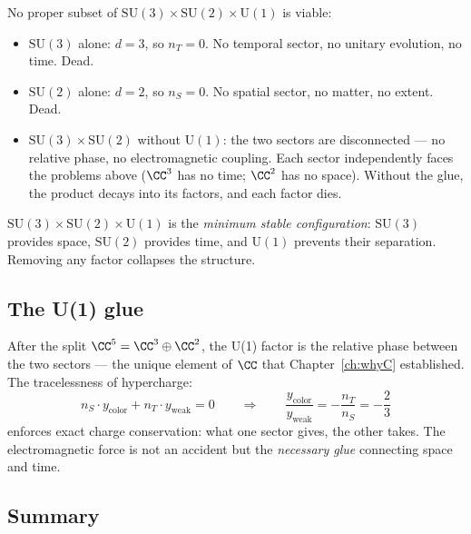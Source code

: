 \begin{remark}
\begin{remark}
No proper subset of $\text{SU}(3) \times \text{SU}(2) \times \text{U}(1)$ is viable:
\begin{itemize}
\item $\text{SU}(3)$ alone: $d = 3$, so $n_T = 0$. No temporal sector, no unitary evolution, no time. Dead.
\item $\text{SU}(2)$ alone: $d = 2$, so $n_S = 0$. No spatial sector, no matter, no extent. Dead.
\item $\text{SU}(3) \times \text{SU}(2)$ without $\text{U}(1)$: the two sectors are disconnected --- no relative phase, no electromagnetic coupling. Each sector independently faces the problems above ($\CC^3$ has no time; $\CC^2$ has no space). Without the glue, the product decays into its factors, and each factor dies.
\end{itemize}
$\text{SU}(3) \times \text{SU}(2) \times \text{U}(1)$ is the \emph{minimum stable configuration}: $\text{SU}(3)$ provides space, $\text{SU}(2)$ provides time, and $\text{U}(1)$ prevents their separation. Removing any factor collapses the structure.
\end{remark}

\subsection{The U(1) glue}
\label{sec:glue}

After the split $\CC^5 = \CC^3 \oplus \CC^2$, the U(1) factor is the relative phase between the two sectors --- the unique element of $\CC$ that Chapter~\ref{ch:whyC} established. The tracelessness of hypercharge:
\begin{equation}
n_S \cdot y_\text{color} + n_T \cdot y_\text{weak} = 0 \qquad\Rightarrow\qquad \frac{y_\text{color}}{y_\text{weak}} = -\frac{n_T}{n_S} = -\frac{2}{3}
\end{equation}
enforces exact charge conservation: what one sector gives, the other takes. The electromagnetic force is not an accident but the \emph{necessary glue} connecting space and time.

\subsection{Summary}


\end{remark}
